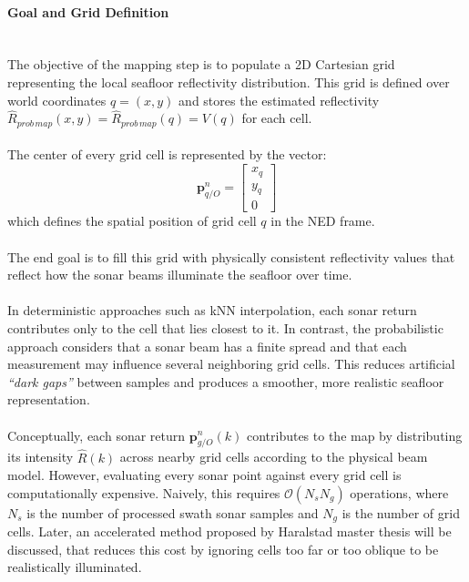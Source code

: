 \paragraph{Goal and Grid Definition} \mbox{}\\[0.5em] \noindent
The objective of the mapping step is to populate a 2D Cartesian grid representing the local seafloor reflectivity distribution. This grid is defined over world coordinates $q=(x, y)$ and stores the estimated reflectivity $\hat{R}_{prob\,map}(x, y)=\hat{R}_{prob\,map}(q)=V(q)$ for each cell.  
\\ \\
The center of every grid cell is represented by the vector:
$$
    \mathbf{p}_{q/O}^{n} =
    \begin{bmatrix}
        x_q \\ y_q \\ 0
    \end{bmatrix}
$$
which defines the spatial position of grid cell $q$ in the NED frame.  
\\ \\
The end goal is to fill this grid with physically consistent reflectivity values that reflect how the sonar beams illuminate the seafloor over time. 
\\ \\
In deterministic approaches such as kNN interpolation, each sonar return contributes only to the cell that lies closest to it. In contrast, the probabilistic approach considers that a sonar beam has a finite spread and that each measurement may influence several neighboring grid cells. This reduces artificial \textit{``dark gaps''} between samples and produces a smoother, more realistic seafloor representation.  
\\ \\
Conceptually, each sonar return $\mathbf{p}_{g/O}^{n}(k)$ contributes to the map by distributing its intensity $\hat{R}(k)$ across nearby grid cells according to the physical beam model. However, evaluating every sonar point against every grid cell is computationally expensive. Naively, this requires $\mathcal{O}(N_s N_g)$ operations, where $N_s$ is the number of processed swath sonar samples and $N_g$ is the number of grid cells. Later, an accelerated method proposed by Haralstad master thesis \cite{side_scan_sonar_master_thesis} will be discussed, that reduces this cost by ignoring cells too far or too oblique to be realistically illuminated.

